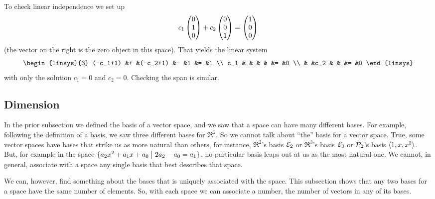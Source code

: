 \begin{exercises}
\begin{answer}
\begin{equation*}
      \end{equation*}
      To check linear independence we set up
      \begin{equation*}
         c_1\begin{pmatrix} 0 \\ 1 \\ 0 \end{pmatrix}+c_2\begin{pmatrix} 0 \\ 0 \\ 1 \end{pmatrix}
         =\begin{pmatrix} 1 \\ 0 \\ 0 \end{pmatrix}
      \end{equation*}
      (the vector on the right is the zero object in this space).
      That yields the linear system
      \begin{equation*}
        \begin{linsys}{3}
          (-c_1+1)  &+  &(-c_2+1)  &-  &1  &=  &1  \\
             c_1    &   &          &   &   &=  &0  \\
                    &   &c_2       &   &   &=  &0
        \end{linsys}
      \end{equation*}
      with only the solution $c_1=0$ and $c_2=0$.
      Checking the span is similar. 
   \end{answer}
\end{exercises}














\subsection{Dimension}
In the prior subsection we defined the basis of a vector space, and
we saw that a space can have many different bases.
For example, following the definition of a basis, we saw three
different bases for $\Re^2$.
So we cannot talk about ``the'' basis for a vector space.
True, some vector spaces have bases that strike us as more natural
than others, for instance, $\Re^2$'s basis ${\cal E}_2$ or 
$\Re^3$'s basis ${\cal E}_3$ or
$\mathcal{P}_2$'s basis $\langle1,x,x^2\rangle$.
But, 
for example in the space $\mbox{$\{a_2x^2+a_1x+a_0\bigm| 2a_2-a_0=a_1\}$}$, 
no particular basis leaps out at us as the most natural one.
We cannot, in general, associate with a space any single basis that
best describes that space.

We can, however, find something about the bases that
is uniquely associated with the space.
This subsection shows that 
any two bases for a space have the same number of elements.
So, with each space we can associate a number, 
the number of vectors in any of its bases.

